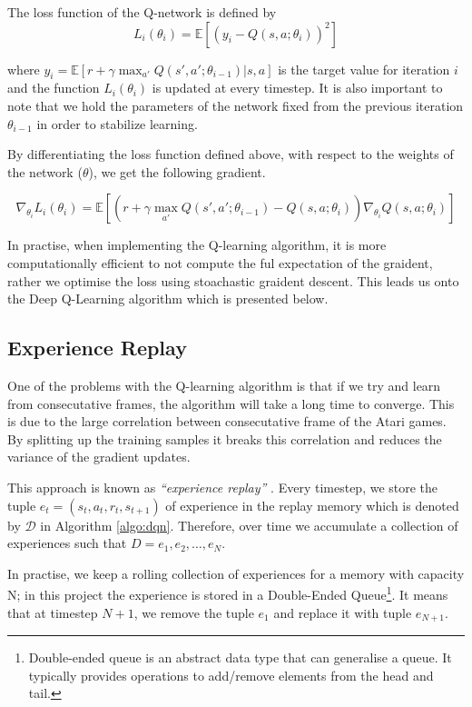 \begin{defn}
	The loss function of the Q-network is defined by
	\[
		L_i(\theta_i) = \mathbb{E}\left[(y_i - Q(s, a; \theta_i))^2\right]
	\]
\end{defn}
where $y_i = \mathbb{E}\left[r + \gamma \max_{a'}Q(s', a'; \theta_{i - 1})\vert s, a\right]$ is the target value for iteration $i$ and the function $L_i(\theta_i)$ is updated at every timestep. It is also important to note that we hold the parameters of the network fixed from the previous iteration $\theta_{i - 1}$ in order to stabilize learning.

By differentiating the loss function defined above, with respect to the weights of the network ($\theta$), we get the following gradient.

\begin{defn}
	\[
		\nabla_{\theta_i} L_i(\theta_i) = \mathbb{E} \left[ \left( r + \gamma \max_{a'} Q(s', a'; \theta_{i - 1}) - Q(s, a; \theta_i)\right) \nabla_{\theta_i} Q(s, a; \theta_i) \right]
	\]
\end{defn}

In practise, when implementing the Q-learning algorithm, it is more computationally efficient to not compute the ful expectation of the graident, rather we optimise the loss using stoachastic graident descent. This leads us onto the Deep Q-Learning algorithm which is presented below.



\subsection{Experience Replay}
\label{dsgn:subsec:exp-replay}

One of the problems with the Q-learning algorithm is that if we try and learn from consecutative frames, the algorithm will take a long time to converge. This is due to the large correlation between consecutative frame of the Atari games. By splitting up the training samples it breaks this correlation and reduces the variance of the gradient updates.

This approach is known as \textit{``experience replay''} \cite{Lin1992ReinforcementLF}. Every timestep, we store the tuple $e_t = (s_t, a_t, r_t, s_{t+1})$ of experience in the replay memory which is denoted by $\mathcal{D}$ in Algorithm \ref{algo:dqn}. Therefore, over time we accumulate a collection of experiences such that $D = e_1, e_2, \hdots, e_N$.

In practise, we keep a rolling collection of experiences for a memory with capacity N; in this project the experience is stored in a Double-Ended Queue\footnote{Double-ended queue is an abstract data type that can generalise a queue. It typically provides operations to add/remove elements from the head and tail.}. It means that at timestep $N+1$, we remove the tuple $e_1$ and replace it with tuple $e_{N+1}$.

